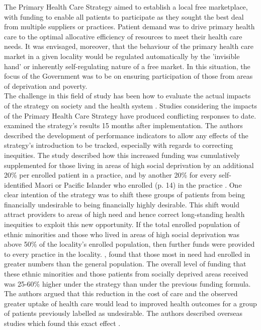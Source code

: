 \documentclass[11pt,a4paper]{article}
\begin{document}
The Primary Health Care Strategy aimed to establish a local free marketplace, with funding to enable all patients to participate as they sought the best deal from multiple suppliers or practices. Patient demand was to drive primary health care to the optimal allocative efficiency of resources to meet their health care needs. It was envisaged, moreover, that the behaviour of the primary health care market in a given locality would be regulated automatically by the 'invisible hand' or inherently self-regulating nature of a free market. In this situation, the focus of the Government was to be on ensuring participation of those from areas of deprivation and poverty. \\


The challenge in this field of study has been how to evaluate the actual impacts of the strategy on society and the health system \citep{howell2005restructuring}. Studies considering the impacts of the Primary Health Care Strategy \citep{king2001primary} have produced conflicting responses to date. \citet{hefford2005reducing} examined the strategy's results 15 months after implementation. The authors described the development of performance indicators to allow any effects of the strategy's introduction to be tracked, especially with regards to correcting inequities. The study described  how this increased funding was cumulatively supplemented for those living in areas of high social deprivation by an additional 20\% per enrolled patient in a practice, and by another 20\% for every self-identified Maori or Pacific Islander who enrolled (p. 14) in the practice \citep{hefford2005reducing}. One clear intention of the strategy was to shift these groups of patients from being financially undesirable to being financially highly desirable. This shift would attract providers to areas of high need and hence correct long-standing health inequities to exploit this new opportunity. If the total enrolled population of ethnic minorities and those who lived in areas of high social deprivation was above 50\% of the locality's enrolled population, then further funds were provided to every practice in the locality. \citet{hefford2005reducing}, found that those most in need had enrolled in greater numbers than the general population. The overall level of funding that these ethnic minorities and those patients from socially deprived areas received was 25-60\% higher under the strategy than under the previous funding formula. The authors argued that this reduction in the cost of care and the observed greater uptake of health care would lead to improved health outcomes for a group of patients previously labelled as undesirable. The authors described overseas studies which found this exact effect \citep{hefford2005reducing}.\\
\end{document}
